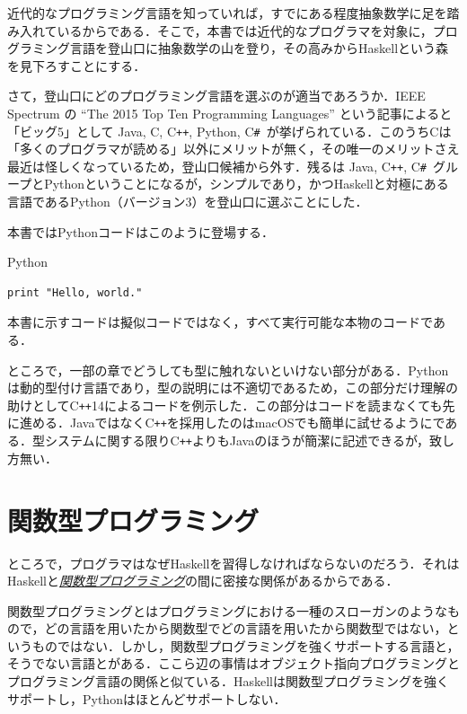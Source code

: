 \documentclass[a4paper]{jsbook}
\newcommand{\programminglanguage}[1]{\textsf{#1}}
\newcommand{\clang}{\programminglanguage{C}}
\newcommand{\csharp}{\programminglanguage{C}\texttt{\#}}
\newcommand{\cxx}{\programminglanguage{C}\texttt{++}}
\newcommand{\cxxfourteen}{\cxx\programminglanguage{14}}
\newcommand{\haskell}{\programminglanguage{Haskell}}
\newcommand{\java}{\programminglanguage{Java}}
\newcommand{\python}{\programminglanguage{Python}}
\newcommand{\keyword}[1]{{\underline{\emph{#1}}}}
\newenvironment{pythoncode}{\begin{itembox}[r]{\python}}{\end{itembox}}
\begin{document}
近代的なプログラミング言語を知っていれば，すでにある程度抽象数学に足を踏み入れているからである．そこで，本書では近代的なプログラマを対象に，プログラミング言語を登山口に抽象数学の山を登り，その高みから\haskell という森を見下ろすことにする．


さて，登山口にどのプログラミング言語を選ぶのが適当であろうか．IEEE Spectrum の ``The 2015 Top Ten Programming Languages'' という記事によると「ビッグ5」として \java, \clang, \cxx, \python, \csharp\ が挙げられている．このうち\clang は「多くのプログラマが読める」以外にメリットが無く，その唯一のメリットさえ最近は怪しくなっているため，登山口候補から外す．残るは \java, \cxx, \csharp\ グループと\python ということになるが，シンプルであり，かつ\haskell と対極にある言語である\python（バージョン3）を登山口に選ぶことにした．

本書では\python コードはこのように登場する．
\begin{pythoncode}
\begin{verbatim}
print "Hello, world."
\end{verbatim}
\end{pythoncode}
本書に示すコードは擬似コードではなく，すべて実行可能な本物のコードである．

ところで，一部の章でどうしても型に触れないといけない部分がある．\python は動的型付け言語であり，型の説明には不適切であるため，この部分だけ理解の助けとして\cxxfourteen によるコードを例示した．この部分はコードを読まなくても先に進める．\java ではなく\cxx を採用したのはmacOSでも簡単に試せるようにである．型システムに関する限り\cxx よりも\java のほうが簡潔に記述できるが，致し方無い．

\section{関数型プログラミング}

ところで，プログラマはなぜ\haskell を習得しなければならないのだろう．それは\haskell と\keyword{関数型プログラミング}の間に密接な関係があるからである．

関数型プログラミングとはプログラミングにおける一種のスローガンのようなもので，どの言語を用いたから関数型でどの言語を用いたから関数型ではない，というものではない．しかし，関数型プログラミングを強くサポートする言語と，そうでない言語とがある．ここら辺の事情はオブジェクト指向プログラミングとプログラミング言語の関係と似ている．\haskell は関数型プログラミングを強くサポートし，\python はほとんどサポートしない．
\end{document}
